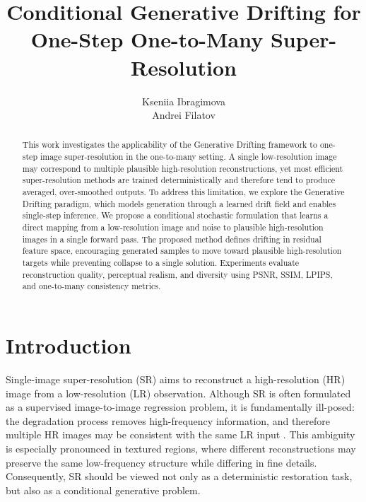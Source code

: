\documentclass{article}
\title{Conditional Generative Drifting for One-Step One-to-Many Super-Resolution}
\author{
  Kseniia Ibragimova\\
  \And
  Andrei Filatov\\
}
\begin{document}
\maketitle

\begin{abstract}
This work investigates the applicability of the Generative Drifting framework to one-step image super-resolution in the one-to-many setting. A single low-resolution image may correspond to multiple plausible high-resolution reconstructions, yet most efficient super-resolution methods are trained deterministically and therefore tend to produce averaged, over-smoothed outputs. To address this limitation, we explore the Generative Drifting paradigm, which models generation through a learned drift field and enables single-step inference. We propose a conditional stochastic formulation that learns a direct mapping from a low-resolution image and noise to plausible high-resolution images in a single forward pass. The proposed method defines drifting in residual feature space, encouraging generated samples to move toward plausible high-resolution targets while preventing collapse to a single solution. Experiments evaluate reconstruction quality, perceptual realism, and diversity using PSNR, SSIM, LPIPS, and one-to-many consistency metrics.
\end{abstract}

\section{Introduction}\label{sec:intro}

Single-image super-resolution (SR) aims to reconstruct a high-resolution (HR) image from a low-resolution (LR) observation. Although SR is often formulated as a supervised image-to-image regression problem, it is fundamentally ill-posed: the degradation process removes high-frequency information, and therefore multiple HR images may be consistent with the same LR input \cite{lugmayr2020srflow,jo2021adatarget,park2021onetomanysr}. This ambiguity is especially pronounced in textured regions, where different reconstructions may preserve the same low-frequency structure while differing in fine details. Consequently, SR should be viewed not only as a deterministic restoration task, but also as a conditional generative problem.
\end{document}
